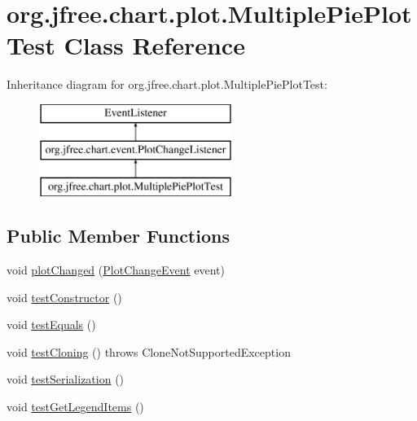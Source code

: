 \hypertarget{classorg_1_1jfree_1_1chart_1_1plot_1_1_multiple_pie_plot_test}{}\section{org.\+jfree.\+chart.\+plot.\+Multiple\+Pie\+Plot\+Test Class Reference}
\label{classorg_1_1jfree_1_1chart_1_1plot_1_1_multiple_pie_plot_test}
Inheritance diagram for org.\+jfree.\+chart.\+plot.\+Multiple\+Pie\+Plot\+Test\+:\begin{figure}[H]
\begin{center}
\leavevmode
\includegraphics[height=3.000000cm]{classorg_1_1jfree_1_1chart_1_1plot_1_1_multiple_pie_plot_test}
\end{center}
\end{figure}
\subsection*{Public Member Functions}
\begin{DoxyCompactItemize}
\item 
void \mbox{\hyperlink{classorg_1_1jfree_1_1chart_1_1plot_1_1_multiple_pie_plot_test_a88e02d041d529a4d0b14a91a2e2758e6}{plot\+Changed}} (\mbox{\hyperlink{classorg_1_1jfree_1_1chart_1_1event_1_1_plot_change_event}{Plot\+Change\+Event}} event)
\item 
void \mbox{\hyperlink{classorg_1_1jfree_1_1chart_1_1plot_1_1_multiple_pie_plot_test_af8dd8dd3ea7d372a377fc793101a4e86}{test\+Constructor}} ()
\item 
void \mbox{\hyperlink{classorg_1_1jfree_1_1chart_1_1plot_1_1_multiple_pie_plot_test_a776a95bd4d68068c03b66ae407357a22}{test\+Equals}} ()
\item 
void \mbox{\hyperlink{classorg_1_1jfree_1_1chart_1_1plot_1_1_multiple_pie_plot_test_a301d38dfae10c721cfb0acbfdacc10d5}{test\+Cloning}} ()  throws Clone\+Not\+Supported\+Exception 
\item 
void \mbox{\hyperlink{classorg_1_1jfree_1_1chart_1_1plot_1_1_multiple_pie_plot_test_a0eedb0031631e9d5b125b4dd44a58bc8}{test\+Serialization}} ()
\item 
void \mbox{\hyperlink{classorg_1_1jfree_1_1chart_1_1plot_1_1_multiple_pie_plot_test_a94c79934d54367253f604f879f7fdb86}{test\+Get\+Legend\+Items}} ()
\end{DoxyCompactItemize}


